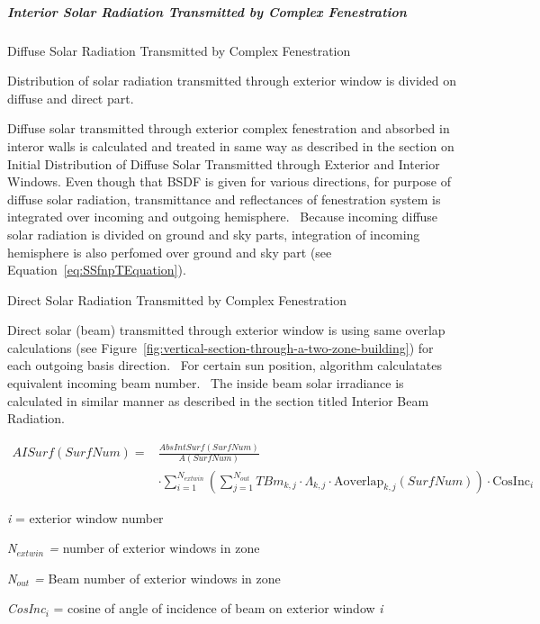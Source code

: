 \subparagraph{Interior Solar Radiation Transmitted by Complex Fenestration}\label{interior-solar-radiation-transmitted-by-complex-fenestration}

Diffuse Solar Radiation Transmitted by Complex Fenestration

Distribution of solar radiation transmitted through exterior window is divided on diffuse and direct part.

Diffuse solar transmitted through exterior complex fenestration and absorbed in interor walls is calculated and treated in same way as described in the section on Initial Distribution of Diffuse Solar Transmitted through Exterior and Interior Windows. Even though that BSDF is given for various directions, for purpose of diffuse solar radiation, transmittance and reflectances of fenestration system is integrated over incoming and outgoing hemisphere.~ Because incoming diffuse solar radiation is divided on ground and sky parts, integration of incoming hemisphere is also perfomed over ground and sky part (see Equation~\ref{eq:SSfnpTEquation}).

Direct Solar Radiation Transmitted by Complex Fenestration

Direct solar (beam) transmitted through exterior window is using same overlap calculations (see Figure~\ref{fig:vertical-section-through-a-two-zone-building}) for each outgoing basis direction.~ For certain sun position, algorithm calculatates equivalent incoming beam number.~ The inside beam solar irradiance is calculated in similar manner as described in the section titled Interior Beam Radiation.

\begin{equation}
\begin{split}
AISurf\left(SurfNum\right) =& \frac{AbsIntSurf\left(SurfNum\right)}{A\left(SurfNum\right)} \\
&\cdot\sum_{i = 1}^{N_{extwin}} \left( \sum_{j = 1}^{N_{out}} TB{m_{k,j}} \cdot \Lambda_{k,j} \cdot \text{Aoverlap}_{k,j} \left( SurfNum \right)\right) \cdot \text{CosInc}_i
\end{split}
\label{eq:AISurfEquation}
\end{equation}

\emph{i} = exterior window number

\emph{N\(_{extwin}\) =} number of exterior windows in zone

\emph{N\(_{out}\) =} Beam number of exterior windows in zone

\emph{CosInc\(_{i}\)} = cosine of angle of incidence of beam on exterior window \emph{i}

